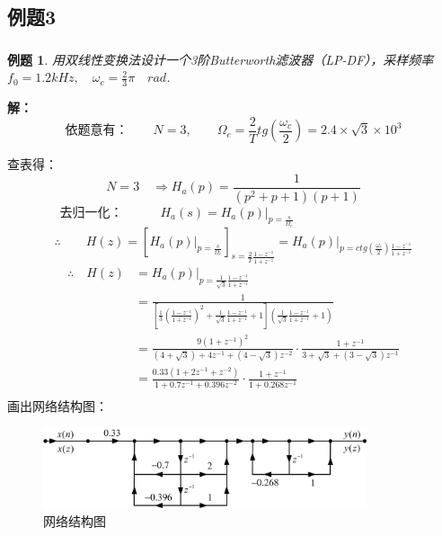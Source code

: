 \documentclass[notheorems,compress,mathserif,table]{beamer}
\newtheorem{example}{例题}
\begin{document}
\subsection*{例题3}
\begin{frame}[allowframebreaks]\frametitle{}%
\begin{example}
用双线性变换法设计一个3阶Butterworth滤波器（LP-DF），采样频率$f_0 = 1.2kHz,\quad\omega_c = \frac{2}{3}\pi\quad rad$.
\end{example}
\textbf{解：}
$$\mbox{依题意有：}\quad\quad
N =3,\quad\quad \Omega_c = \frac{2}{T}tg(\frac{\omega_c}{2})=2.4\times\sqrt{3}\times 10^3$$
\par 查表得：
$$N = 3\quad \Longrightarrow H_a(p) = \frac{1}{(p^2 + p+1)(p+1)}$$
\newpage
$$\mbox{去归一化：}\quad\quad\quad
      H_a(s) = H_a(p)|_{p=\frac{s}{\Omega_c}}
\quad\quad\quad\quad\quad\quad\quad\quad\quad$$
$$\therefore\quad\quad H(z) = \left[H_a(p)\Big|_{p=\frac{s}{\Omega_c}}\right]
  _{s=\frac{2}{T}\frac{1-z^{-1}}{1+z^{-1}}}
  = H_a(p)\Big|_{p=ctg(\frac{\omega_c}{2})\frac{1-z^{-1}}{1+z^{-1}}}$$
\begin{equation*}
  \begin{split}
      \therefore\quad H(z)
           &= H_a(p)\Big|_{p=\frac{1}{\sqrt{3}}\frac{1-z^{-1}}{1+z^{-1}}}\\
           &= \frac{1}{\left[
              \frac{1}{3}(\frac{1-z^{-1}}{1+z^{-1}})^2 +
              \frac{1}{\sqrt{3}}\frac{1-z^{-1}}{1+z^{-1}}+1\right]
              (\frac{1}{\sqrt{3}}\frac{1-z^{-1}}{1+z^{-1}}+1)}\\
           &= \frac{9(1+z^{-1})^2}{(4+\sqrt{3})+4z^{-1}+(4-\sqrt{3})z^{-2}}\cdot
              \frac{1+z^{-1}}{3+\sqrt{3}+(3-\sqrt{3})z^{-1}}\\
           &= \frac{0.33(1+2z^{-1}+z^{-2})}{1+0.7z^{-1}+0.396z^{-2}}\cdot
              \frac{1+z^{-1}}{1+0.268z^{-1}}\\
  \end{split}
  \end{equation*}
  \newpage
  画出网络结构图：
  \begin{figure}[h]
    \centering
    \includegraphics[width=0.85\textwidth]{fig25_example3.jpg}
    \caption{网络结构图}
    \label{}
  \end{figure}
\end{frame}


\end{document}
